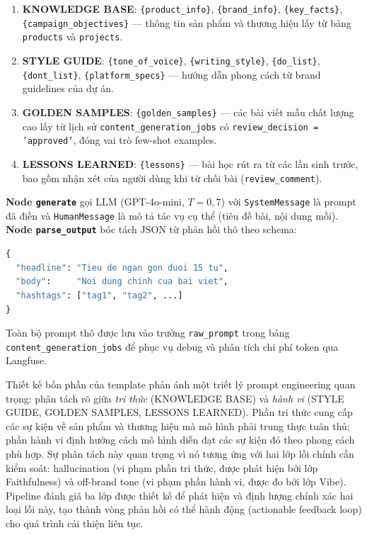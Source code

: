 \begin{enumerate}
  \item \textbf{KNOWLEDGE BASE}: \texttt{\{product\_info\}},
    \texttt{\{brand\_info\}}, \texttt{\{key\_facts\}},
    \texttt{\{campaign\_objectives\}} --- thông tin sản phẩm và thương
    hiệu lấy từ bảng \texttt{products} và \texttt{projects}.
  \item \textbf{STYLE GUIDE}: \texttt{\{tone\_of\_voice\}},
    \texttt{\{writing\_style\}}, \texttt{\{do\_list\}},
    \texttt{\{dont\_list\}}, \texttt{\{platform\_specs\}} --- hướng
    dẫn phong cách từ brand guidelines của dự án.
  \item \textbf{GOLDEN SAMPLES}: \texttt{\{golden\_samples\}} --- các
    bài viết mẫu chất lượng cao lấy từ lịch sử \texttt{content\_generation\_jobs}
    có \texttt{review\_decision = 'approved'}, đóng vai trò few-shot
    examples.
  \item \textbf{LESSONS LEARNED}: \texttt{\{lessons\}} --- bài học
    rút ra từ các lần sinh trước, bao gồm nhận xét của người dùng khi
    từ chối bài (\texttt{review\_comment}).
\end{enumerate}

\textbf{Node \texttt{generate}} gọi LLM (GPT-4o-mini, $T=0{,}7$) với
\texttt{SystemMessage} là prompt đã điền và \texttt{HumanMessage} là
mô tả tác vụ cụ thể (tiêu đề bài, nội dung mồi). \textbf{Node
\texttt{parse\_output}} bóc tách JSON từ phản hồi thô theo schema:

\begin{lstlisting}[language=Python, caption={Output schema của ContentAgent.}]
{
  "headline": "Tieu de ngan gon duoi 15 tu",
  "body":     "Noi dung chinh cua bai viet",
  "hashtags": ["tag1", "tag2", ...]
}
\end{lstlisting}

Toàn bộ prompt thô được lưu vào trường \texttt{raw\_prompt} trong bảng
\texttt{content\_generation\_jobs} để phục vụ debug và phân tích chi phí
token qua Langfuse.

Thiết kế bốn phần của template phản ánh một triết lý prompt engineering
quan trọng: phân tách rõ giữa \emph{tri thức} (KNOWLEDGE BASE) và
\emph{hành vi} (STYLE GUIDE, GOLDEN SAMPLES, LESSONS LEARNED). Phần tri
thức cung cấp các sự kiện về sản phẩm và thương hiệu mà mô hình phải
trung thực tuân thủ; phần hành vi định hướng cách mô hình diễn đạt các
sự kiện đó theo phong cách phù hợp. Sự phân tách này quan trọng vì nó
tương ứng với hai lớp lỗi chính cần kiểm soát: hallucination (vi phạm
phần tri thức, được phát hiện bởi lớp Faithfulness) và off-brand tone
(vi phạm phần hành vi, được đo bởi lớp Vibe). Pipeline đánh giá ba lớp
được thiết kế để phát hiện và định lượng chính xác hai loại lỗi này,
tạo thành vòng phản hồi có thể hành động (actionable feedback loop) cho
quá trình cải thiện liên tục.

